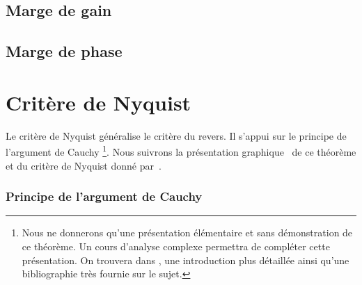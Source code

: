 \subsection{Marge de gain}

\subsection{Marge de phase}


\section{Critère de Nyquist}

Le critère de Nyquist généralise le critère du revers.
Il s'appui sur le principe de l'argument de Cauchy
\footnote{Nous ne donnerons qu'une présentation élémentaire et sans 
démonstration de ce théorème. Un cours d'analyse complexe permettra de 
compléter cette présentation. On trouvera dans \cite{laas_pc7bis,reg}, 
une introduction plus détaillée ainsi qu'une bibliographie très fournie 
sur le sujet.}. Nous suivrons la présentation \og graphique\fg~ de ce théorème 
et du critère de Nyquist donné par~\cite{reg}. 

\subsubsection{Principe de l'argument de Cauchy}

